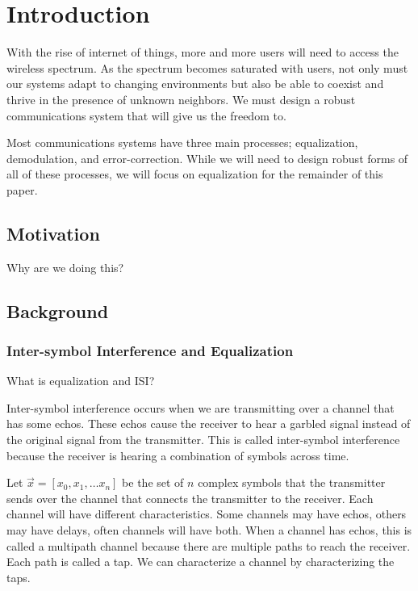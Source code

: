 \chapter{Introduction}

With the rise of internet of things, more and more users will need to access the wireless spectrum.  As the spectrum becomes saturated with users, not only must our systems adapt to changing environments but also be able to coexist and thrive in the presence of unknown neighbors.  
We must design a robust communications system that will give us the freedom to. 

Most communications systems have three main processes; equalization, demodulation, and error-correction.  While we will need to design robust forms of all of these processes, we will focus on equalization for the remainder of this paper. 

\section{Motivation}
Why are we doing this?

\section{Background}

\subsection{Inter-symbol Interference and Equalization}

What is equalization and ISI? 

Inter-symbol interference occurs when we are transmitting over a channel that has some echos.  These echos cause the receiver to hear a garbled signal instead of the original signal from the transmitter.  This is called inter-symbol interference because the receiver is hearing a combination of symbols across time. 

Let $\vec{x}=[x_0, x_1, \ldots x_n]$ be the set of $n$ complex symbols that the transmitter sends over the channel that connects the transmitter to the receiver.
Each channel will have different characteristics. Some channels may have echos, others may have delays, often channels will have both.  When a channel has echos, this is called a multipath channel because there are multiple paths to reach the receiver.  Each path is called a tap.  We can characterize a channel by characterizing the taps.

